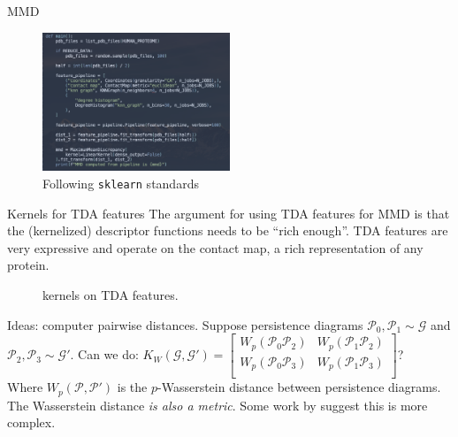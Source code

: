 \documentclass[aspectratio=169, 10pt, dvipsnames, handout]{beamer}
\begin{document}
\begin{frame}[fragile]{MMD}
  \begin{figure}
    \centering
    \includegraphics[width=0.5\textwidth]{figures/pipeline.png}
    \caption{Following \texttt{sklearn} standards}
    \label{fig:mmd_current}
  \end{figure}
\end{frame}


\begin{frame}[fragile]{Kernels for TDA features}
  The argument for using TDA features for MMD is that the (kernelized)
  descriptor functions needs to be ``rich enough''. TDA features are very
  expressive and operate on the contact map, a rich representation of any protein.
  \begin{figure}[center]
    \centering
    \caption{kernels on TDA features.}
    \label{fig:overview}
  \end{figure}
  Ideas: computer pairwise distances. Suppose persistence diagrams $\mathcal{P}_0,
  \mathcal{P}_1\sim\mathcal{G}$ and $\mathcal{P}_2, \mathcal{P}_3\sim\mathcal{G}'$.
  Can we do:
  $K_{W}(\mathcal{G},\mathcal{G}')=\begin{bmatrix}
    W_p(\mathcal{P}_0\mathcal{P}_2) & W_p(\mathcal{P}_1\mathcal{P}_2)\\
    W_p(\mathcal{P}_0\mathcal{P}_3) & W_p(\mathcal{P}_1\mathcal{P}_3)\\
  \end{bmatrix}$?\\
  Where $W_p(\mathcal{P},\mathcal{P}')$ is the $p$-Wasserstein distance between
  persistence diagrams. \\
  The Wasserstein distance \textit{is also a metric}. Some work by \cite{oh2019kernel} suggest this is more complex.
\end{frame}
\end{document}
